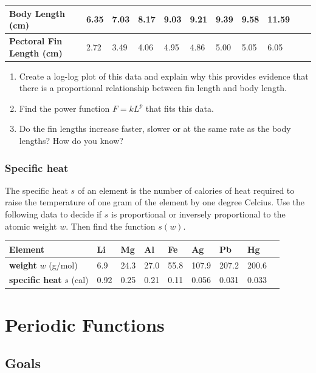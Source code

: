 \documentclass[
]{book}
\providecommand{\tightlist}{%
  \setlength{\itemsep}{0pt}\setlength{\parskip}{0pt}}
\begin{document}
\begin{longtable}[]{@{}lllllllllll@{}}
\toprule
\textbf{Body Length (cm)} & 6.35 & 7.03 & 8.17 & 9.03 & 9.21 & 9.39 & 9.58 & 11.59 & &\tabularnewline
\midrule
\endhead
\textbf{Pectoral Fin Length (cm)} & 2.72 & 3.49 & 4.06 & 4.95 & 4.86 & 5.00 & 5.05 & 6.05 & &\tabularnewline
\bottomrule
\end{longtable}

\begin{enumerate}
\def\labelenumi{\arabic{enumi}.}
\tightlist
\item
  Create a log-log plot of this data and explain why this provides evidence that there is a proportional relationship between fin length and body length.
\item
  Find the power function \(F = k L^p\) that fits this data.
\item
  Do the fin lengths increase faster, slower or at the same rate as the body lengths? How do you know?
\end{enumerate}

\hypertarget{specific-heat}{%
\subsection{Specific heat}\label{specific-heat}}

The specific heat \(s\) of an element is the number of calories of heat required to raise the temperature of one gram of the element by one degree Celcius. Use the following data to decide if \(s\) is proportional or inversely proportional to the atomic weight \(w\). Then find the function \(s(w)\).

\begin{longtable}[]{@{}lllllllll@{}}
\toprule
\textbf{Element} & Li & Mg & Al & Fe & Ag & Pb & Hg &\tabularnewline
\midrule
\endhead
\textbf{weight} \(w\) (g/mol) & 6.9 & 24.3 & 27.0 & 55.8 & 107.9 & 207.2 & 200.6 &\tabularnewline
\textbf{specific heat} \(s\) (cal) & 0.92 & 0.25 & 0.21 & 0.11 & 0.056 & 0.031 & 0.033 &\tabularnewline
\bottomrule
\end{longtable}

\hypertarget{periodic-functions}{%
\chapter{Periodic Functions}\label{periodic-functions}}

\hypertarget{goals-5}{%
\section{Goals}\label{goals-5}}
\end{document}
